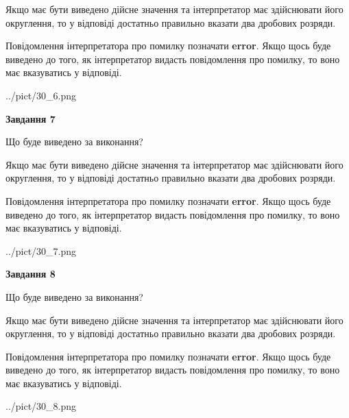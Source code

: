 \documentclass[12pt, ukrainian]{article}
\begin{document}
{\begin {Large}
Якщо має бути виведено дійсне значення та інтерпретатор має здійснювати його округлення, 
то у відповіді достатньо правильно вказати два дробових розряди.

Повідомлення інтерпретатора про помилку позначати \textbf{error}.
Якщо щось буде виведено до того, як інтерпретатор видасть повідомлення про помилку, 
то воно має вказуватись у відповіді. \par

\begin{center}
	{../pict/30_6.png}
\end{center}
\newpage

{\begin {center}\textbf{Завдання 7}\end {center}}\par
Що буде виведено за виконання? \par

Якщо має бути виведено дійсне значення та інтерпретатор має здійснювати його округлення, 
то у відповіді достатньо правильно вказати два дробових розряди.

Повідомлення інтерпретатора про помилку позначати \textbf{error}.
Якщо щось буде виведено до того, як інтерпретатор видасть повідомлення про помилку, 
то воно має вказуватись у відповіді. \par

\begin{center}
	{../pict/30_7.png}
\end{center}
\newpage

{\begin {center}\textbf{Завдання 8}\end {center}}\par
Що буде виведено за виконання? \par

Якщо має бути виведено дійсне значення та інтерпретатор має здійснювати його округлення, 
то у відповіді достатньо правильно вказати два дробових розряди.

Повідомлення інтерпретатора про помилку позначати \textbf{error}.
Якщо щось буде виведено до того, як інтерпретатор видасть повідомлення про помилку, 
то воно має вказуватись у відповіді. \par

\begin{center}
	{../pict/30_8.png}
\end{center}
\newpage


\end{Large}}
\end{document}
